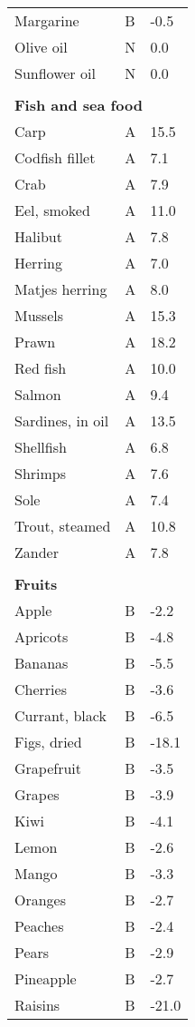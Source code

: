 \documentclass[../main.tex]{subfiles}
\begin{document}
\begin{longtable}{p{7cm}p{0.5cm}p{1cm}}
Margarine  & B  & -0.5 \\
Olive oil  & N  & 0.0 \\
Sunflower oil  & N  & 0.0 \\
 \\
\multicolumn{3}{l}{\textbf{Fish and sea food}}  \\
Carp   & A   & 15.5 \\
Codfish fillet   & A   & 7.1 \\
Crab   & A   & 7.9 \\
Eel, smoked   & A   & 11.0 \\
Halibut   & A   & 7.8 \\
Herring   & A   & 7.0 \\
Matjes herring   & A   & 8.0 \\
Mussels   & A   & 15.3 \\
Prawn  & A   & 18.2 \\
Red fish   & A   & 10.0 \\
Salmon   & A   & 9.4 \\
Sardines, in oil   & A   & 13.5 \\
Shellfish  & A  & 6.8 \\
Shrimps  & A  & 7.6 \\
Sole  & A  & 7.4 \\
Trout, steamed   & A   & 10.8 \\
Zander   & A  & 7.8 \\
 \\
\multicolumn{3}{l}{\textbf{Fruits}} \\
Apple  & B  & -2.2 \\
Apricots  & B  & -4.8 \\
Bananas  & B  & -5.5 \\
Cherries   & B  & -3.6 \\
Currant, black  & B  & -6.5 \\
Figs, dried  & B  & -18.1 \\
Grapefruit  & B  & -3.5 \\
Grapes  & B  & -3.9 \\
Kiwi  & B  & -4.1 \\
Lemon  & B  & -2.6 \\
Mango  & B  & -3.3 \\
Oranges  & B  & -2.7 \\
Peaches  & B  & -2.4 \\
Pears  & B  & -2.9 \\
Pineapple  & B  & -2.7 \\
Raisins  & B  & -21.0 \\

\end{longtable}
\end{document}
